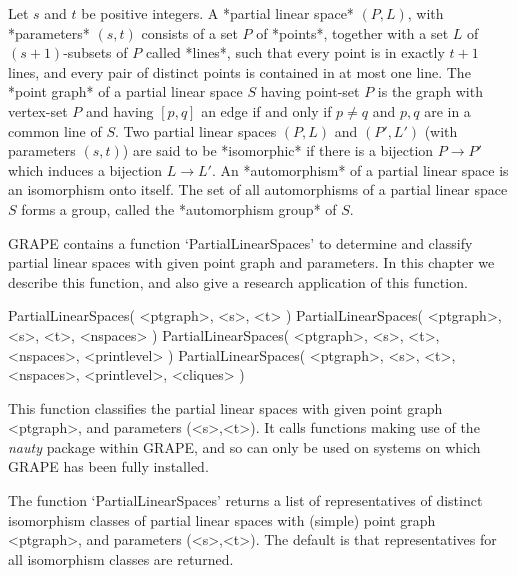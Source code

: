 %
%
%
%
\def\GRAPE{\sf GRAPE}
\def\nauty{\it nauty}
\def\G{\Gamma}
\def\Aut{{\rm Aut}\,}
\def\x{\times}


Let $s$ and  $t$  be positive integers. A *partial linear space*
$(P,L)$, with *parameters* $(s,t)$ consists of a set $P$ of *points*,
together with a set $L$ of $(s+1)$-subsets of $P$ called *lines*,
such that every point is in exactly $t+1$ lines, and every pair of
distinct points is contained in at most one line.  The *point graph*
of a partial linear space $S$ having point-set $P$ is the graph with
vertex-set $P$ and having $[p,q]$ an edge if and only if $p\not=q$ and
$p,q$ are in a common line of $S$. Two partial linear spaces $(P,L)$
and $(P',L')$ (with parameters $(s,t)$) are said to be *isomorphic*
if there is a bijection $P\to P'$ which induces a bijection $L\to L'$.
An *automorphism* of a partial linear space is an isomorphism onto itself.
The set of all automorphisms of a partial linear space $S$ forms a group,
called the *automorphism group* of $S$.

{\GRAPE} contains a function `PartialLinearSpaces' to determine and
classify partial linear spaces with given point graph and parameters.
In this chapter we describe this function, and also give a research
application of this function.


\>PartialLinearSpaces( <ptgraph>, <s>, <t> )
\>PartialLinearSpaces( <ptgraph>, <s>, <t>, <nspaces> )
\>PartialLinearSpaces( <ptgraph>, <s>, <t>, <nspaces>, <printlevel> )
\>PartialLinearSpaces( <ptgraph>, <s>, <t>, <nspaces>, <printlevel>, <cliques> )

This function classifies the partial linear spaces with given point
graph <ptgraph>, and parameters (<s>,<t>). It calls functions making
use of the {\nauty} package within {\GRAPE}, and so can only be used on
systems on which {\GRAPE} has been fully installed.

The function `PartialLinearSpaces' returns a list of representatives
of distinct isomorphism classes of partial linear spaces with (simple)
point graph <ptgraph>, and parameters (<s>,<t>). The default is that
representatives for all isomorphism classes are returned.

